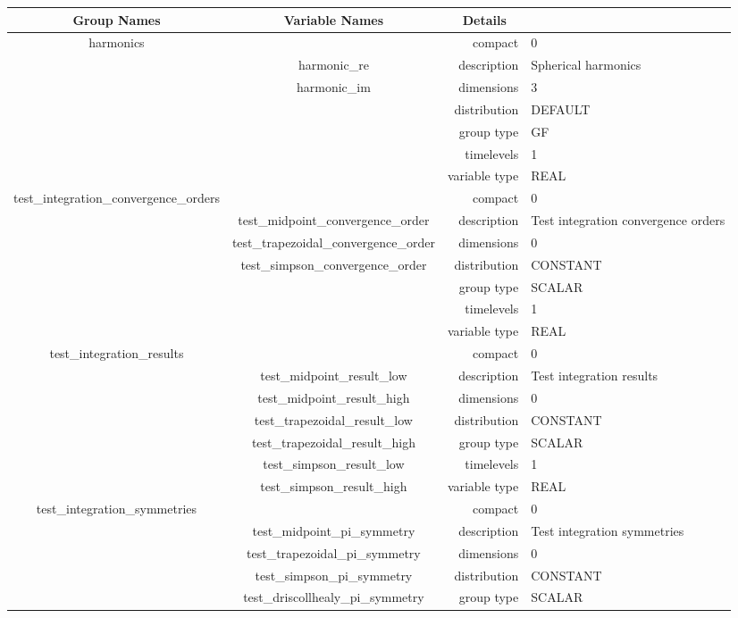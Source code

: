 \begin{tabular*}{150mm}{|c|c@{\extracolsep{\fill}}|rl|} \hline 
~ {\bf Group Names} ~ & ~ {\bf Variable Names} ~  &{\bf Details} ~ & ~\\ 
\hline 
harmonics &  & compact & 0 \\ 
 & harmonic\_re & description & Spherical harmonics \\ 
 & harmonic\_im & dimensions & 3 \\ 
 &  & distribution & DEFAULT \\ 
 &  & group type & GF \\ 
 &  & timelevels & 1 \\ 
 &  & variable type & REAL \\ 
\hline 
test\_integration\_convergence\_orders &  & compact & 0 \\ 
 & test\_midpoint\_convergence\_order & description & Test integration convergence orders \\ 
 & test\_trapezoidal\_convergence\_order & dimensions & 0 \\ 
 & test\_simpson\_convergence\_order & distribution & CONSTANT \\ 
 &  & group type & SCALAR \\ 
 &  & timelevels & 1 \\ 
 &  & variable type & REAL \\ 
\hline 
test\_integration\_results &  & compact & 0 \\ 
 & test\_midpoint\_result\_low & description & Test integration results \\ 
 & test\_midpoint\_result\_high & dimensions & 0 \\ 
 & test\_trapezoidal\_result\_low & distribution & CONSTANT \\ 
 & test\_trapezoidal\_result\_high & group type & SCALAR \\ 
 & test\_simpson\_result\_low & timelevels & 1 \\ 
 & test\_simpson\_result\_high & variable type & REAL \\ 
\hline 
test\_integration\_symmetries &  & compact & 0 \\ 
 & test\_midpoint\_pi\_symmetry & description & Test integration symmetries \\ 
 & test\_trapezoidal\_pi\_symmetry & dimensions & 0 \\ 
 & test\_simpson\_pi\_symmetry & distribution & CONSTANT \\ 
 & test\_driscollhealy\_pi\_symmetry & group type & SCALAR \\ 

\end{tabular*}
